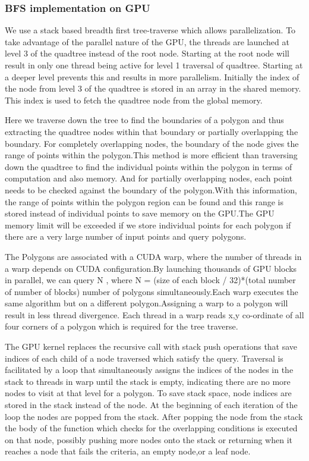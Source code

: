 \documentclass{article}
\begin{document}
\subsubsection{BFS implementation on GPU}


We use a stack based breadth first tree-traverse which allows parallelization. To take advantage of the parallel nature of the GPU, the threads are launched at level 3 of the quadtree instead of the root node. Starting at the root node will result in only one thread being active for level 1 traversal of quadtree. Starting at a deeper level prevents this and results in more parallelism.
Initially the index of the node from level 3 of the quadtree is stored in an array in the shared memory.
This index is used to fetch the quadtree node from the global memory.

Here we traverse down the tree to find the boundaries of a polygon and thus extracting the quadtree nodes within that boundary or partially overlapping the boundary. For completely overlapping nodes, the boundary of the node gives the range of points within the polygon.This method is more efficient than traversing down the quadtree to find the individual points within the polygon in terms of computation and also memory. And for partially overlapping nodes, each point needs to be checked against the boundary of the polygon.With this information, the range of points within the polygon region can be found and this range is stored instead of individual points to save memory on the GPU.The GPU memory limit will be exceeded if we store individual points for each polygon  if there are a very large number of input points and query polygons.

The Polygons are associated with a CUDA warp, where the number of threads in a warp depends on CUDA configuration.By launching thousands of GPU blocks in parallel, we can query N , where N = (size of each block / 32)*(total number of number of blocks) number of polygons simultaneously.Each warp executes the same algorithm but on a different polygon.Assigning a warp to a polygon will result in less thread divergence. Each thread in a warp reads x,y co-ordinate of all four corners of a polygon which is required for the tree traverse.

The GPU kernel replaces the recursive call with stack push operations that save indices of each child of a node traversed which satisfy the query. Traversal is facilitated by a loop that simultaneously assigns the indices of the nodes in the stack to threads in warp until the stack is empty, indicating there are no more nodes to visit at that level for a polygon. To save stack space, node indices are stored in the stack instead of the node. At the beginning of each iteration of the loop the  nodes are popped from the stack. After popping the node from the stack the body of the function which checks for the overlapping conditions is executed on that node, possibly pushing more nodes onto the stack or returning when it reaches a node that fails the criteria, an empty node,or a leaf node.
\end{document}
